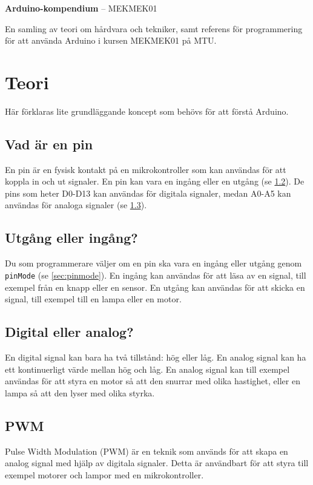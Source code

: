 \documentclass[11pt]{article}
\begin{document}
\raggedright{}
\begin{center}
  \textbf{\huge{Arduino-kompendium}}
  \huge{-- MEKMEK01}
\end{center}

En samling av teori om hårdvara och tekniker, samt referens för programmering
för att använda Arduino i kursen MEKMEK01 på MTU.

\thispagestyle{empty}
\tableofcontents\label{toc}

\newpage

\section{Teori}
Här förklaras lite grundläggande koncept som behövs för att förstå Arduino.

\subsection{Vad är en pin}\label{sec:pin}
En pin är en fysisk kontakt på en mikrokontroller som kan användas för att
koppla in och ut signaler. En pin kan vara en ingång eller en utgång (se
\ref{sec:io}). De pins som heter D0-D13 kan användas för digitala signaler,
medan A0-A5 kan användas för analoga signaler (se \ref{sec:analog-digital}).

\subsection{Utgång eller ingång?}\label{sec:io}
Du som programmerare väljer om en pin ska vara en ingång eller utgång genom
\texttt{pinMode} (se \ref{sec:pinmode}). En ingång kan användas för att läsa av
en signal, till exempel från en knapp eller en sensor. En utgång kan användas
för att skicka en signal, till exempel till en lampa eller en motor.

\subsection{Digital eller analog?}\label{sec:analog-digital}
En digital signal kan bara ha två tillstånd: hög eller låg. En analog signal
kan ha ett kontinuerligt värde mellan hög och låg. En analog signal kan till
exempel användas för att styra en motor så att den snurrar med olika hastighet,
eller en lampa så att den lyser med olika styrka.

\subsection{PWM}\label{sec:pwm}
Pulse Width Modulation (PWM) är en teknik som används för att skapa en analog
signal
med hjälp av digitala signaler. Detta är användbart för att styra till exempel
motorer och lampor med en mikrokontroller.
\end{document}
